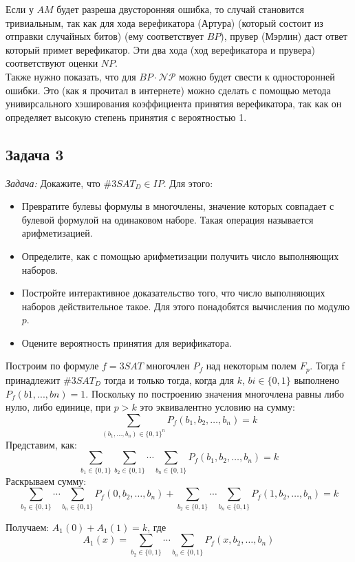 \documentclass[a4paper,12pt]{article} %
\begin{document}
Если у $ AM $ будет разреша двусторонняя ошибка, то случай становится тривиальным, так как для хода верефикатора (Артура) (который состоит из отправки случайных битов) (ему соответствует $ BP $), прувер (Мэрлин) даст ответ который примет верефикатор. Эти два хода (ход верефикатора и прувера) соответствуют оценки $ NP $.\\ Также нужно показать, что для $ BP\cdot \mathcal{NP} $ можно будет свести к односторонней ошибки. Это (как я прочитал в интернете) можно сделать с помощью метода унивирсального хэширования коэффициента принятия верефикатора, так как он определяет высокую степень принятия с вероятностью 1.

\subsection*{Задача 3}
\textit{Задача:} Докажите, что $\# 3SAT_D \in IP$. Для этого:
\begin{itemize}
\item Превратите булевы формулы в многочлены, значение которых совпадает с булевой формулой на одинаковом наборе. Такая операция называется арифметизацией.
\item Определите, как с помощью арифметизации получить число выполняющих наборов.
\item Постройте интерактивное доказательство того, что число выполняющих наборов действительное такое. Для этого понадобятся вычисления по модулю $p$.
\item Оцените вероятность принятия для верификатора.
\end{itemize}

Построим по формуле $ f = 3SAT $  многочлен $ P_f $ над некоторым полем $ F_p $. Тогда f принадлежит $\# 3SAT_D$ тогда и только тогда, когда для $ k $, $bi \in \{0,1\}$ выполнено $P_f(b1,...,bn) = 1$. Поскольку по построению значения многочлена равны либо нулю, либо единице, при $p > k$ это эквивалентно условию на сумму: 
$$\sum_{\left(b_{1}, \ldots, b_{n}\right) \in\{0,1\}^{n}} P_{f}\left(b_{1}, b_{2}, \ldots, b_{n}\right)=k$$
Представим, как:
$$\sum_{b_{1} \in\{0,1\}} \sum_{b_{2} \in\{0,1\}} \cdots \sum_{b_{n} \in\{0,1\}} P_{f}\left(b_{1}, b_{2}, \ldots, b_{n}\right)=k$$
Раскрываем сумму:
$$\sum_{b_{2} \in\{0,1\}} \cdots \sum_{b_{n} \in\{0,1\}} P_{f}\left(0, b_{2}, \ldots, b_{n}\right)+\sum_{b_{2} \in\{0,1\}} \cdots \sum_{b_{n} \in\{0,1\}} P_{f}\left(1, b_{2}, \ldots, b_{n}\right)=k$$

Получаем: $A_{1}(0)+A_{1}(1)=k$, где 
$$A_{1}(x)=\sum_{b_{2} \in\{0,1\}} \cdots \sum_{b_{n} \in\{0,1\}} P_{f}\left(x, b_{2}, \ldots, b_{n}\right)$$
\end{document}
